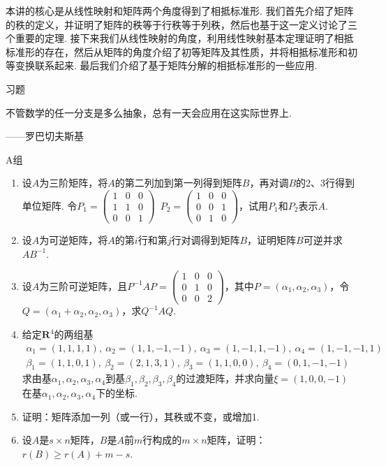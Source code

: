 本讲的核心是从线性映射和矩阵两个角度得到了相抵标准形. 我们首先介绍了矩阵的秩的定义，并证明了矩阵的秩等于行秩等于列秩，然后也基于这一定义讨论了三个重要的定理. 接下来我们从线性映射的角度，利用线性映射基本定理证明了相抵标准形的存在，然后从矩阵的角度介绍了初等矩阵及其性质，并将相抵标准形和初等变换联系起来. 最后我们介绍了基于矩阵分解的相抵标准形的一些应用.

\vspace{2ex}
\centerline{\heiti \Large 习题}

\vspace{2ex}
{\kaishu 不管数学的任一分支是多么抽象，总有一天会应用在这实际世界上.}
\begin{flushright}
    \kaishu
    ——罗巴切夫斯基
\end{flushright}

\centerline{\heiti A组}
\begin{enumerate}
    \item 设$A$为三阶矩阵，将$A$的第二列加到第一列得到矩阵$B$，再对调$B$的2、3行得到单位矩阵. 令$P_1=\begin{pmatrix}1 & 0 & 0 \\ 1 & 1 & 0 \\ 0 & 0 & 1\end{pmatrix}\enspace
    P_2=\begin{pmatrix}1 & 0 & 0 \\ 0 & 0 & 1 \\ 0 & 1 & 0\end{pmatrix}$，试用$P_1$和$P_2$表示$A$.

    \item 设$A$为可逆矩阵，将$A$的第$i$行和第$j$行对调得到矩阵$B$，证明矩阵$B$可逆并求$AB^{-1}$.

    \item 设$A$为三阶可逆矩阵，且$P^{-1}AP=\begin{pmatrix}1 & 0 & 0 \\ 0 & 1 & 0 \\ 0 & 0 & 2\end{pmatrix}$，其中$P=(\alpha_1,\alpha_2,\alpha_3)$，令$Q=(\alpha_1+\alpha_2,\alpha_2,\alpha_3)$，求$Q^{-1}AQ$.

    \item 给定$\mathbf{R}^4$的两组基
          \begin{gather*}
              \alpha_1=(1,1,1,1),\ \alpha_2=(1,1,-1,-1),\ \alpha_3=(1,-1,1,-1),\ \alpha_4=(1,-1,-1,1) \\
              \beta_1=(1,1,0,1),\ \beta_2=(2,1,3,1),\ \beta_3=(1,1,0,0),\ \beta_4=(0,1,-1,-1)
          \end{gather*}
          求由基$\alpha_1,\alpha_2,\alpha_3,\alpha_4$到基$\beta_1,\beta_2,\beta_3,\beta_4$的过渡矩阵，并求向量$\xi=(1,0,0,-1)$在基$\alpha_1,\alpha_2,\alpha_3,\alpha_4$下的坐标.

    \item 证明：矩阵添加一列（或一行），其秩或不变，或增加1.

    \item 设$A$是$s \times n$矩阵，$B$是$A$前$m$行构成的$m \times n$矩阵，证明：$r(B) \geqslant r(A) + m - s$.
\end{enumerate}

